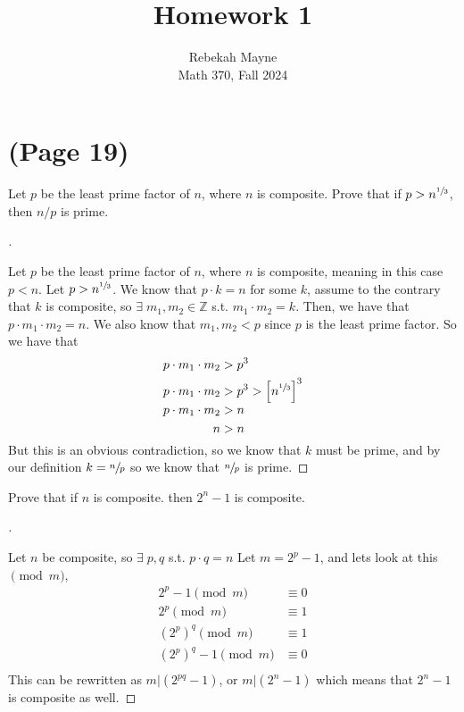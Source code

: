 \documentclass[11pt]{article}
\newcommand{\Z}{\mathbb{Z}}
\newenvironment{myproof}[1][\proofname]{%
  \begin{proof}[#1]$ $\par\nobreak\ignorespaces
}{%
  \end{proof}
}
\newenvironment{problem}[2][Problem]{\begin{trivlist}
\item[\hskip \labelsep {\bfseries #1}\hskip \labelsep {\bfseries #2.}]}{\end{trivlist}}
\begin{document}
\title{Homework 1}
\author{Rebekah Mayne\\
    Math 370, Fall 2024}
\maketitle


\section{(Page 19)}

\begin{problem}{12}
Let $p$ be the least prime factor of $n$, where $n$ is composite. Prove that if $p>n^{\sfrac{1}{3}}$, then $n/p$ is prime.
\end{problem}

\begin{myproof}
    Let $p$ be the least prime factor of $n$, where $n$ is composite, meaning in this case $p<n$. Let $p>n^{\sfrac{1}{3}}$. We know that $p\cdot k=n$ for some $k$, assume to the contrary that $k$ is composite, so $\exists \; m_1,m_2 \in\Z$ s.t. $m_1\cdot m_2=k$. Then, we have that $p\cdot m_1 \cdot m_2=n$. We also know that $m_1,m_2<p$ since $p$ is the least prime factor. So we have that
    \begin{align*}
        p\cdot m_1 \cdot m_2 & > p^3                                   \\
        p\cdot m_1 \cdot m_2 & > p^3 > \left[n^{\sfrac{1}{3}}\right]^3 \\
        p\cdot m_1 \cdot m_2 & > n                                     \\
        n                    & > n                                     \\
    \end{align*}
    But this is an obvious contradiction, so we know that $k$ must be prime, and by our definition $k=\sfrac{n}{p}$ so we know that $\sfrac{n}{p}$ is prime.
\end{myproof}


\begin{problem}{14}
Prove that if $n$ is composite. then $2^n-1$ is composite.
\end{problem}

\begin{myproof}
    Let $n$ be composite, so $\exists \; p,q$ s.t. $p\cdot q =n$ Let $m=2^p-1$, and lets look at this $\pmod{m}$,
    \begin{align*}
        2^p-1 \pmod{m}                   & \equiv 0 \\
        2^p \pmod{m}                     & \equiv 1 \\
        \left(2^{p}\right)^q \pmod{m}    & \equiv 1 \\
        \left(2^{p}\right)^q -1 \pmod{m} & \equiv 0 \\
    \end{align*}
    This can be rewritten as $m| \left(2^{pq} -1\right)$, or $m| \left(2^{n} -1\right)$ which means that $2^n-1$ is composite as well.
\end{myproof}
\end{document}
